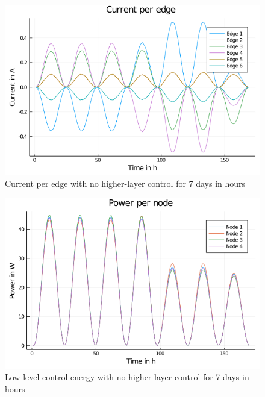 \begin{figure}[h]
	\centering
	\includegraphics[scale=0.45]{pictures/plots/DC_prosumer_no_ILC_current_per_edge.png}
	\caption{Current per edge with no higher-layer control for 7 days in hours}
	\label{fig:current_no_ILC}
\end{figure}
\begin{figure}[h]
	\centering
	\includegraphics[scale=0.45]{pictures/plots/DC_prosumer_no_ILC_power_per_node.png}
	\caption{Low-level control energy with no higher-layer control for 7 days in hours}
	\label{fig:power_no_ILC}
\end{figure}
